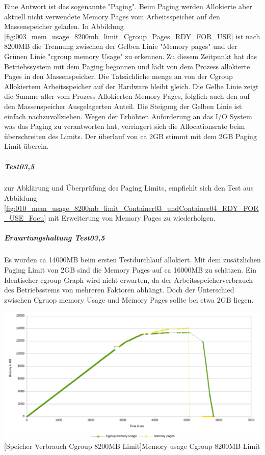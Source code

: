 Eine Antwort ist das sogenannte "Paging". Beim Paging werden Allokierte aber aktuell nicht verwendete Memory Pages vom Arbeitsspeicher auf den Massenspeicher geladen. In Abbildung \ref{fig:003_mem_usage_8200mb_limit_Cgroup_Pages_RDY_FOR_USE} ist nach 8200MB die Trennung zwischen der Gelben Linie "Memory pages" und der Grünen Linie "cgroup memory Usage" zu erkennen. Zu diesem Zeitpunkt hat das Betriebssystem mit dem Paging begonnen und lädt von dem Prozess allokierte Pages in den Massenspeicher. Die Tatsächliche menge an von der Cgroup Allokiertem Arbeitsspeicher auf der Hardware bleibt gleich. Die Gelbe Linie zeigt die Summe aller vom Prozess Allokierten Memory Pages, folglich auch den auf den Massenspeicher Ausgelagerten Anteil. Die Steigung der Gelben Linie ist einfach nachzuvollziehen. Wegen der Erhöhten Anforderung an das I/O System was das Paging zu verantworten hat, verringert sich die Allocationsrate beim überschreiten des Limits. Der überlauf von ca 2GB stimmt mit dem 2GB Paging Limit überein.

\subparagraph{Test03,5}
zur Abklärung und Überprüfung des Paging Limits, empfiehlt sich den Test aus Abbildung \ref{fig:010_mem_usage_8200mb_limit_Container03_undContainer04_RDY_FOR_USE_Focu} mit Erweiterung von Memory Pages zu wiederholgen.

\subparagraph{Erwartungshaltung Test03,5}
Es wurden ca 14000MB beim ersten Testdurchlauf allokiert. Mit dem zusätzlichen Paging Limit von 2GB sind die Memory Pages auf ca 16000MB zu schätzen. Ein Identischer cgroup Graph wird nicht erwarten, da der Arbeitsspeicherverbrauch des Betriebsstems von mehreren Faktoren abhängt. Doch der Unterschied zwischen Cgruop memory Usage und Memory Pages sollte bei etwa 2GB liegen. 

\vspace{1em}
\begin{minipage}{\linewidth}
	\centering
	\includegraphics[width=1\linewidth]{pics/001,5_mem_usage_No_Limit_Cgroup_Pages_RDY_FOR_USE.png}
	[Speicher Verbrauch Cgroup 8200MB Limit]{Memory usage Cgroup 8200MB Limit}
	\label{fig:001,5_mem_usage_No_Limit_Cgroup_Pages_RDY_FOR_USE.png}
\end{minipage}


